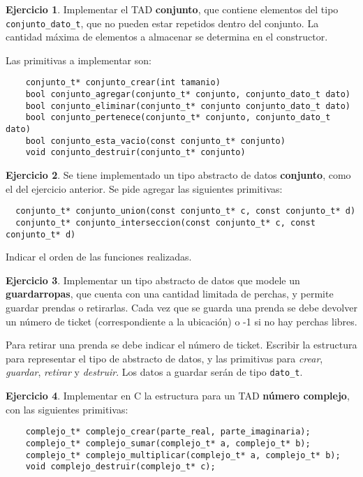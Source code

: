\documentclass[11pt,a4paper]{article}
\theoremstyle{definition}
\newtheorem{ejercicio}{Ejercicio}[section]
\begin{document}
\begin{ejercicio}
Implementar el TAD \textbf{conjunto}, que contiene elementos del tipo
\lstinline!conjunto_dato_t!, que no pueden estar repetidos dentro del conjunto. La
cantidad máxima de elementos a almacenar se determina en el constructor.

Las primitivas a implementar son:
\begin{lstlisting}
	conjunto_t* conjunto_crear(int tamanio)
	bool conjunto_agregar(conjunto_t* conjunto, conjunto_dato_t dato)
	bool conjunto_eliminar(conjunto_t* conjunto conjunto_dato_t dato)
	bool conjunto_pertenece(conjunto_t* conjunto, conjunto_dato_t dato)
	bool conjunto_esta_vacio(const conjunto_t* conjunto)
	void conjunto_destruir(conjunto_t* conjunto)
\end{lstlisting}
\end{ejercicio}

\begin{ejercicio}
Se tiene implementado un tipo abstracto de datos \textbf{conjunto}, como el del
ejercicio anterior.  Se pide agregar las siguientes primitivas:
\begin{lstlisting}
  conjunto_t* conjunto_union(const conjunto_t* c, const conjunto_t* d)
  conjunto_t* conjunto_interseccion(const conjunto_t* c, const conjunto_t* d)
\end{lstlisting}
Indicar el orden de las funciones realizadas.
\end{ejercicio}

\begin{ejercicio}
Implementar un tipo abstracto de datos que modele un \textbf{guardarropas},
que cuenta con una cantidad limitada de perchas, y permite guardar prendas
o retirarlas. Cada vez que se guarda una prenda se debe devolver un número
de ticket (correspondiente a la ubicación) o -1 si no hay perchas libres.

Para retirar una prenda se debe indicar el número de ticket.  Escribir la
estructura para representar el tipo de abstracto de datos, y las primitivas
para \textit{crear}, \textit{guardar}, \textit{retirar} y
\textit{destruir}. Los datos a guardar serán de tipo \lstinline!dato_t!.
\end{ejercicio}

\begin{ejercicio}
Implementar en C la estructura para un TAD \textbf{número complejo}, con
las siguientes primitivas:
\begin{lstlisting}
    complejo_t* complejo_crear(parte_real, parte_imaginaria);
    complejo_t* complejo_sumar(complejo_t* a, complejo_t* b);
    complejo_t* complejo_multiplicar(complejo_t* a, complejo_t* b);
    void complejo_destruir(complejo_t* c);
\end{lstlisting}
\end{ejercicio}
\end{document}
